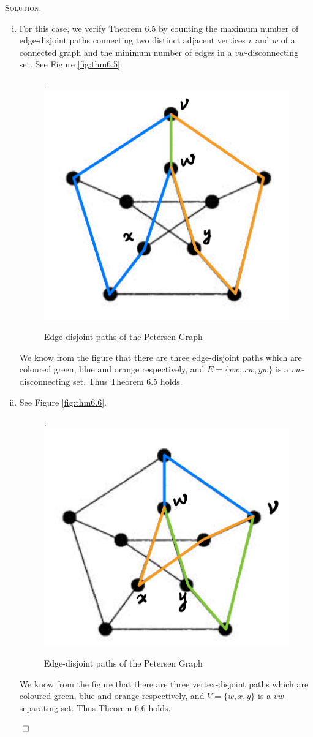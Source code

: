 \documentclass[12pt, a4paper, oneside]{ctexart}
\newenvironment{solution}{%
	\par\noindent\textsc{Solution. }\ignorespaces
}{%
	\hfill$\qed$\par
}
\begin{document}
	\begin{solution}
		
		\begin{enumerate}[(i)]
			\item For this case, we verify Theorem 6.5 by counting the maximum number of edge-disjoint paths connecting two distinct adjacent vertices $v$ and $w$ of a connected graph and the minimum number of edges in a $vw$-disconnecting set. See Figure \eqref{fig:thm6.5}.
			\begin{figure}[H]
				\small
				\centering
				.\includegraphics[width=0.36\columnwidth]{Figure/fig1.jpg}
				\caption{Edge-disjoint paths of the Petersen Graph}
				\label{fig:thm6.5}
			\end{figure}
			We know from the figure that there are three edge-disjoint paths which are coloured green, blue and orange respectively, and $E = \{vw, xw, yw\}$ is a $vw$-disconnecting set. Thus Theorem 6.5 holds.
			\item See Figure \eqref{fig:thm6.6}.
			\begin{figure}[H]
				\small
				\centering
				.\includegraphics[width=0.36\columnwidth]{Figure/fig2.jpg}
				\caption{Edge-disjoint paths of the Petersen Graph}
				\label{fig:thm6.6}
			\end{figure}
			We know from the figure that there are three vertex-disjoint paths which are coloured green, blue and orange respectively, and $V = \{w, x, y\}$ is a $vw$-separating set. Thus Theorem 6.6 holds.
		\end{enumerate}
		
	\end{solution}
	
\end{document}
